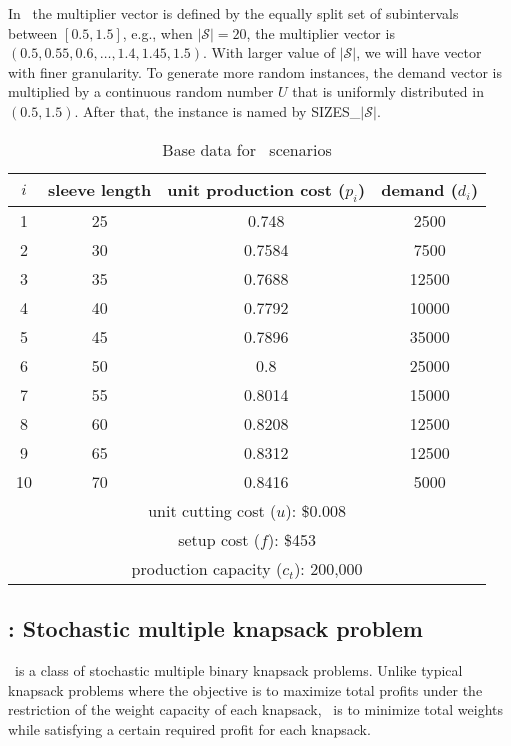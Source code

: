 In \siplibtwo\, the multiplier vector is defined by the equally split set of subintervals between $[0.5,1.5]$, e.g., when $|\mathcal{S}|=20$, the multiplier vector is $(0.5,0.55,0.6,\ldots,1.4,1.45,1.5)$. With larger value of $|\mathcal{S}|$, we will have vector with finer granularity. To generate more random instances, the demand vector is multiplied by a continuous random number $U$ that is uniformly distributed in $(0.5,1.5)$. After that, the instance is named by SIZES\_$|\mathcal{S}|$.

\begin{table}[]
	\centering
	\caption{Base data for \sizes\ scenarios \cite{journal:JSW1999}}
	\label{sizes:data}
	\begin{tabular}{cccc}
		\hline
		$i$  & sleeve length & unit production cost ($p_i$) & demand ($d_i$) \\ \hline
		1  & 25            & 0.748                & 2500   \\
		2  & 30            & 0.7584               & 7500   \\
		3  & 35            & 0.7688               & 12500  \\
		4  & 40            & 0.7792               & 10000  \\
		5  & 45            & 0.7896               & 35000  \\
		6  & 50            & 0.8                  & 25000  \\
		7  & 55            & 0.8014               & 15000  \\
		8  & 60            & 0.8208               & 12500  \\
		9  & 65            & 0.8312               & 12500  \\
		10 & 70            & 0.8416               & 5000   \\ \hline
		\multicolumn{4}{c}{unit cutting cost ($u$): \$0.008}     \\
		\multicolumn{4}{c}{setup cost ($f$): \$453}              \\ 
		\multicolumn{4}{c}{production capacity ($c_t$): 200,000} \\ \hline
	\end{tabular}
\end{table}

\subsection{\smkp: Stochastic multiple knapsack problem} \label{SMKP}
\smkp\ is a class of stochastic multiple binary knapsack problems. Unlike typical knapsack problems where the objective is to maximize total profits under the restriction of the weight capacity of each knapsack, \smkp\ is to minimize total weights while satisfying a certain required profit for each knapsack. 

